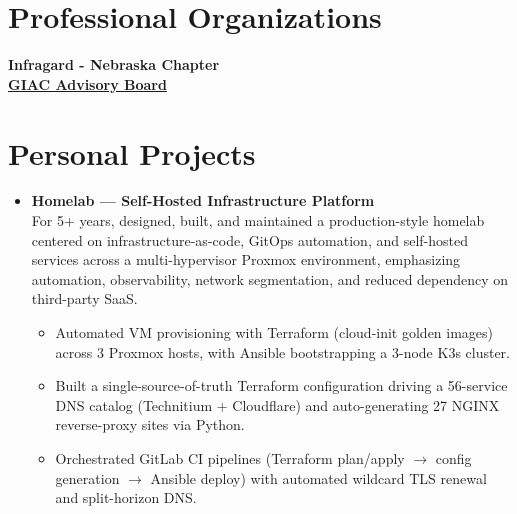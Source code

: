 \documentclass[letterpaper,9pt]{extarticle}
\newcommand{\resumeItem}[1]{\item\small #1}
\begin{document}
\section*{Professional Organizations}
\small
\textbf{Infragard - Nebraska Chapter} \\
\href{https://www.credly.com/badges/a65cec63-e07c-4e52-b154-842564aadf65/public_url}{\textbf{GIAC Advisory Board}}

\section*{Personal Projects}
\small
\begin{itemize}[leftmargin=0pt, label={}, itemsep=0.2em]
  \item
  \textbf{Homelab — Self-Hosted Infrastructure Platform}\\[0.15em]
  For 5+ years, designed, built, and maintained a production-style homelab centered on infrastructure-as-code, GitOps automation, and self-hosted services across a multi-hypervisor Proxmox environment, emphasizing automation, observability, network segmentation, and reduced dependency on third-party SaaS.
  \begin{itemize}
  \end{itemize}
  \vspace{0.15em}
  \begin{itemize}
    \resumeItem{Automated VM provisioning with Terraform (cloud-init golden images) across 3 Proxmox hosts, with Ansible bootstrapping a 3-node K3s cluster.}
    \resumeItem{Built a single-source-of-truth Terraform configuration driving a 56-service DNS catalog (Technitium + Cloudflare) and auto-generating 27 NGINX reverse-proxy sites via Python.}
    \resumeItem{Orchestrated GitLab CI pipelines (Terraform plan/apply $\rightarrow$ config generation $\rightarrow$ Ansible deploy) with automated wildcard TLS renewal and split-horizon DNS.}
  \end{itemize}
\end{itemize}

\end{document}
